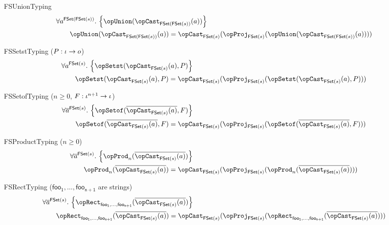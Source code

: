 \documentclass[11pt, a4paper, oneside]{article}
\begin{document}
\begin{axioms}
\item[FSUnionTyping] \[
        \begin{aligned}
            &\forall a^{\FSet(\FSet(s))}.\, \st{ \opUnion(\opCast_{\FSet(\FSet(s))}(a)) } \\
            &\qquad \opUnion(\opCast_{\FSet(\FSet(s))}(a)) = \opCast_{\FSet(s)}(\opProj_{\FSet(s)}(\opUnion(\opCast_{\FSet(\FSet(s))}(a))))
        \end{aligned}
    \]

\item[FSSetstTyping ($P : \iota \rightarrow o$)] \[
        \begin{aligned}
            &\forall a^{\FSet(s)}.\, \st{ \opSetst(\opCast_{\FSet(s)}(a), P) } \\
            &\qquad \opSetst(\opCast_{\FSet(s)}(a), P) = \opCast_{\FSet(s)}(\opProj_{\FSet(s)}(\opSetst(\opCast_{\FSet(s)}(a), P)))
        \end{aligned}
    \]

\item[FSSetofTyping ($n \ge 0$, $F : \iota^{n+1} \rightarrow \iota$)] \[
        \begin{aligned}
            &\forall \overline{a}^{\FSet(s)}.\, \st{ \opSetof(\overline{\opCast_{\FSet(s)}(a)}, F) } \\
            &\qquad \opSetof(\overline{\opCast_{\FSet(s)}(a)}, F) = \opCast_{\FSet(s)}(\opProj_{\FSet(s)}(\opSetof(\overline{\opCast_{\FSet(s)}(a)}, F)))
        \end{aligned}
    \]

\item[FSProductTyping ($n \ge 0$)] \[
        \begin{aligned}
            &\forall \overline{a}^{\FSet(s)}.\, \st{ \opProd_n(\overline{\opCast_{\FSet(s)}(a)}) } \\
            &\qquad \opProd_n(\overline{\opCast_{\FSet(s)}(a)}) = \opCast_{\FSet(s)}(\opProj_{\FSet(s)}(\opProd_n(\overline{\opCast_{\FSet(s)}(a)})))
        \end{aligned}
    \]

\item[FSRectTyping (\rm$\mathsf{foo_1},\dots,\mathsf{foo_{n+1}}$ are strings)] \[
        \begin{aligned}
            &\forall \overline{a}^{\FSet(s)}.\, \st{ \opRect_{\mathsf{foo_1}, \dots, \mathsf{foo_{n+1}}}(\overline{\opCast_{\FSet(s)}(a)}) } \\
            &\qquad \opRect_{\mathsf{foo_1}, \dots, \mathsf{foo_{n+1}}}(\overline{\opCast_{\FSet(s)}(a)}) = \opCast_{\FSet(s)}(\opProj_{\FSet(s)}(\opRect_{\mathsf{foo_1}, \dots, \mathsf{foo_{n+1}}}(\overline{\opCast_{\FSet(s)}(a)})))
        \end{aligned}
    \]


\end{axioms}
\end{document}

